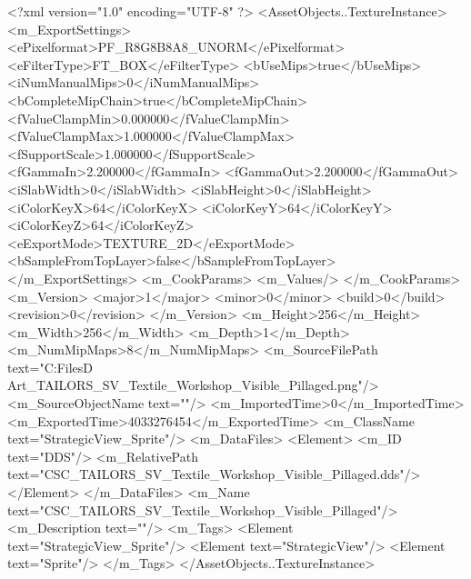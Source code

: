 <?xml version="1.0" encoding="UTF-8" ?>
<AssetObjects..TextureInstance>
	<m_ExportSettings>
		<ePixelformat>PF_R8G8B8A8_UNORM</ePixelformat>
		<eFilterType>FT_BOX</eFilterType>
		<bUseMips>true</bUseMips>
		<iNumManualMips>0</iNumManualMips>
		<bCompleteMipChain>true</bCompleteMipChain>
		<fValueClampMin>0.000000</fValueClampMin>
		<fValueClampMax>1.000000</fValueClampMax>
		<fSupportScale>1.000000</fSupportScale>
		<fGammaIn>2.200000</fGammaIn>
		<fGammaOut>2.200000</fGammaOut>
		<iSlabWidth>0</iSlabWidth>
		<iSlabHeight>0</iSlabHeight>
		<iColorKeyX>64</iColorKeyX>
		<iColorKeyY>64</iColorKeyY>
		<iColorKeyZ>64</iColorKeyZ>
		<eExportMode>TEXTURE_2D</eExportMode>
		<bSampleFromTopLayer>false</bSampleFromTopLayer>
	</m_ExportSettings>
	<m_CookParams>
		<m_Values/>
	</m_CookParams>
	<m_Version>
		<major>1</major>
		<minor>0</minor>
		<build>0</build>
		<revision>0</revision>
	</m_Version>
	<m_Height>256</m_Height>
	<m_Width>256</m_Width>
	<m_Depth>1</m_Depth>
	<m_NumMipMaps>8</m_NumMipMaps>
	<m_SourceFilePath text="C:\Users\Shadow\Desktop\Working Files\2D Art\Quarters\Tailors\StrategicView\CSC_TAILORS_SV_Textile_Workshop_Visible_Pillaged.png"/>
	<m_SourceObjectName text=""/>
	<m_ImportedTime>0</m_ImportedTime>
	<m_ExportedTime>4033276454</m_ExportedTime>
	<m_ClassName text="StrategicView_Sprite"/>
	<m_DataFiles>
		<Element>
			<m_ID text="DDS"/>
			<m_RelativePath text="CSC_TAILORS_SV_Textile_Workshop_Visible_Pillaged.dds"/>
		</Element>
	</m_DataFiles>
	<m_Name text="CSC_TAILORS_SV_Textile_Workshop_Visible_Pillaged"/>
	<m_Description text=""/>
	<m_Tags>
		<Element text="StrategicView_Sprite"/>
		<Element text="StrategicView"/>
		<Element text="Sprite"/>
	</m_Tags>
</AssetObjects..TextureInstance>

